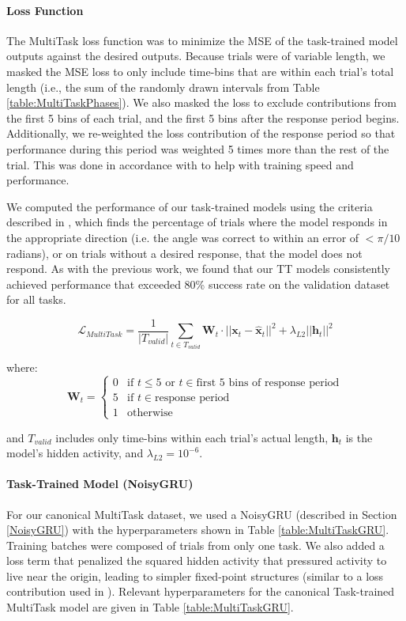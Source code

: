\documentclass{article}
\begin{document}
\paragraph{Loss Function}
The MultiTask loss function was to minimize the MSE of the task-trained model outputs against the desired outputs. Because trials were of variable length, we masked the MSE loss to only include time-bins that are within each trial's total length (i.e., the sum of the randomly drawn intervals from Table \ref{table:MultiTaskPhases}). We also masked the loss to exclude contributions from the first 5 bins of each trial, and the first 5 bins after the response period begins. Additionally, we re-weighted the loss contribution of the response period so that performance during this period was weighted 5 times more than the rest of the trial. This was done in accordance with \cite{driscoll_flexible_2022} to help with training speed and performance.

We computed the performance of our task-trained models using the criteria described in \cite{driscoll_flexible_2022}, which finds the percentage of trials where the model responds in the appropriate direction (i.e. the angle was correct to within an error of $< \pi/10$ radians), or on trials without a desired response, that the model does not respond. As with the previous work, we found that our TT models consistently achieved performance that exceeded 80\% success rate on the validation dataset for all tasks.

$$\mathcal{L}_{MultiTask} = \frac{1}{|T_{valid}|} \sum_{t \in T_{valid}} \mathbf{W}_t \cdot ||\mathbf{x}_t - \mathbf{\hat{x}}_t||^2 + \lambda_{L2} ||\mathbf{h}_t||^2$$

where:
$$\mathbf{W}_t = \begin{cases}
0 & \text{if } t \leq 5 \text{ or } t \in \text{first 5 bins of response period} \\
5 & \text{if } t \in \text{response period} \\
1 & \text{otherwise}
\end{cases}$$

and $T_{valid}$ includes only time-bins within each trial's actual length, $\mathbf{h}_t$ is the model's hidden activity, and $\lambda_{L2} = 10^{-6}$.

\paragraph{Task-Trained Model (NoisyGRU) \label{MultitTaskNoisyGRU}}
For our canonical MultiTask dataset, we used a NoisyGRU (described in Section \ref{NoisyGRU}) with the hyperparameters shown in Table \ref{table:MultiTaskGRU}. Training batches were composed of trials from only one task. We also added a loss term that penalized the squared hidden activity that pressured activity to live near the origin, leading to simpler fixed-point structures (similar to a loss contribution used in \cite{driscoll_flexible_2022}). Relevant hyperparameters for the canonical Task-trained MultiTask model are given in Table \ref{table:MultiTaskGRU}.
\end{document}

